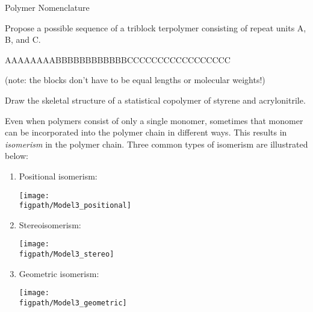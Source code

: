 \begin{activity}{Polymer Nomenclature}
\begin{ctqs}
\begin{enumerate}
		\end{enumerate}
		
	\question Propose a possible sequence of a triblock terpolymer consisting of repeat units A, B, and C.
	
		\begin{solution}[0.25in]
		
			AAAAAAAABBBBBBBBBBBBCCCCCCCCCCCCCCCCC
			
			(note: the blocks don't have to be equal lengths or molecular weights!)
	
		\end{solution}
	
	\question Draw the skeletal structure of a statistical copolymer of styrene and acrylonitrile.
	
		\begin{solution}[0.75in]
		\studentdisplay{
					~
		}\end{solution}
	
\end{ctqs}


\begin{model}[Isomerism]

	Even when polymers consist of only a single monomer, sometimes that monomer can be incorporated into the polymer chain in different ways.  This results in \textit{isomerism} in the polymer chain.  Three common types of isomerism are illustrated below:
	
	\begin{enumerate}
		\item Positional isomerism:
		
			\centerline{\texttt{[image: \\figpath/Model3\_positional]}}
		
		\item Stereoisomerism:
		
			\centerline{\texttt{[image: \\figpath/Model3\_stereo]}}
		
		\item Geometric isomerism:
		
		\vspace{4pt}	\centerline{\texttt{[image: \\figpath/Model3\_geometric]}}
		
	\end{enumerate}

\end{model}


\end{activity}
